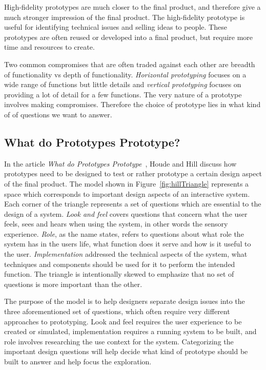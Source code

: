 High-fidelity prototypes are much closer to the final product, and therefore give a much stronger impression of the final product. The high-fidelity prototype is useful for identifying technical issues and selling ideas to people. These prototypes are often reused or developed into a final product, but require more time and resources to create.

Two common compromises that are often traded against each other are breadth of functionality vs depth of functionality. \textit{Horizontal prototyping} focuses on a wide range of functions but little details and \textit{vertical prototyping} focuses on providing a lot of detail for a few functions. The very nature of a prototype involves making compromises. Therefore the choice of prototype lies in what kind of of questions we want to answer. 

\subsection{What do Prototypes Prototype?}
\label{sec:prototypesPrototype}
In the article \textit{What do Prototypes Prototype}~\cite{prototypesPrototype}, Houde and Hill discuss how prototypes need to be designed to test or rather prototype a certain design aspect of the final product. The model shown in Figure~\ref{fig:hillTriangle} represents a space which corresponds to important design aspects of an interactive system. Each corner of the triangle represents a set of questions which are essential to the design of a system. \textit{Look and feel} covers questions that concern what the user feels, sees and hears when using the system, in other words the sensory experience. \textit{Role}, as the name states, refers to questions about what role the system has in the users life, what function does it serve and how is it useful to the user. \textit{Implementation} addressed the technical aspects of the system, what techniques and components should be used for it to perform the intended function. The triangle is intentionally skewed to emphasize that no set of questions is more important than the other.

The purpose of the model is to help designers separate design issues into the three aforementioned set of questions, which often require very different approaches to prototyping. Look and feel requires the user experience to be created or simulated, implementation requires a running system to be built, and role involves researching the use context for the system. Categorizing the important design questions will help decide what kind of prototype should be built to answer and help focus the exploration.


